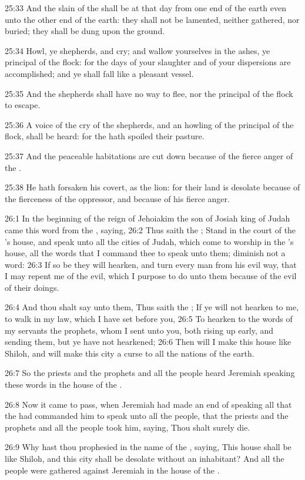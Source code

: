 25:33 And the slain of the \LORD shall be at that day from one end of the earth even unto the other end of the earth: they shall not be lamented, neither gathered, nor buried; they shall be dung upon the ground.

25:34 Howl, ye shepherds, and cry; and wallow yourselves in the ashes, ye principal of the flock: for the days of your slaughter and of your dispersions are accomplished; and ye shall fall like a pleasant vessel.

25:35 And the shepherds shall have no way to flee, nor the principal of the flock to escape.

25:36 A voice of the cry of the shepherds, and an howling of the principal of the flock, shall be heard: for the \LORD hath spoiled their pasture.

25:37 And the peaceable habitations are cut down because of the fierce anger of the \LORD.

25:38 He hath forsaken his covert, as the lion: for their land is desolate because of the fierceness of the oppressor, and because of his fierce anger.

26:1 In the beginning of the reign of Jehoiakim the son of Josiah king of Judah came this word from the \LORD, saying, 26:2 Thus saith the \LORD; Stand in the court of the \LORD's house, and speak unto all the cities of Judah, which come to worship in the \LORD's house, all the words that I command thee to speak unto them; diminish not a word: 26:3 If so be they will hearken, and turn every man from his evil way, that I may repent me of the evil, which I purpose to do unto them because of the evil of their doings.

26:4 And thou shalt say unto them, Thus saith the \LORD; If ye will not hearken to me, to walk in my law, which I have set before you, 26:5 To hearken to the words of my servants the prophets, whom I sent unto you, both rising up early, and sending them, but ye have not hearkened; 26:6 Then will I make this house like Shiloh, and will make this city a curse to all the nations of the earth.

26:7 So the priests and the prophets and all the people heard Jeremiah speaking these words in the house of the \LORD.

26:8 Now it came to pass, when Jeremiah had made an end of speaking all that the \LORD had commanded him to speak unto all the people, that the priests and the prophets and all the people took him, saying, Thou shalt surely die.

26:9 Why hast thou prophesied in the name of the \LORD, saying, This house shall be like Shiloh, and this city shall be desolate without an inhabitant?  And all the people were gathered against Jeremiah in the house of the \LORD.

